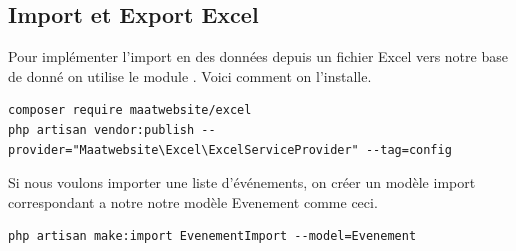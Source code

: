 \documentclass[12pt,a4paper]{article}
\begin{document}
\subsection{Import et Export Excel}
Pour implémenter l'import en des données depuis un fichier Excel vers notre base de donné on utilise le
module . Voici comment on l'installe.

\begin{verbatim}
composer require maatwebsite/excel
php artisan vendor:publish --provider="Maatwebsite\Excel\ExcelServiceProvider" --tag=config
\end{verbatim}

Si nous voulons importer une liste d'événements, on créer un modèle import correspondant a notre
notre modèle Evenement comme ceci.

\begin{verbatim}
php artisan make:import EvenementImport --model=Evenement
\end{verbatim}
\end{document}

